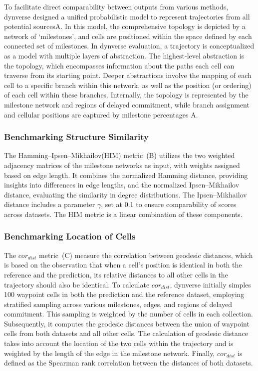 To facilitate direct comparability between outputs from various methods, dynverse\citep{saelens2019comparison} designed a unified probabilistic model to represent trajectories from all potential sourcesA. In this model, the comprehensive topology is depicted by a network of `milestones', and cells are positioned within the space defined by each connected set of milestones. In dynverse evaluation, a trajectory is conceptualized as a model with multiple layers of abstraction. The highest-level abstraction is the topology, which encompasses information about the paths each cell can traverse from its starting point. Deeper abstractions involve the mapping of each cell to a specific branch within this network, as well as the position (or ordering) of each cell within these branches. Internally, the topology is represented by the milestone network and regions of delayed commitment, while branch assignment and cellular positions are captured by milestone percentages A.


\subsubsection{Benchmarking Structure Similarity}
The Hamming–Ipsen–Mikhailov(HIM) metric~(B) utilizes the two weighted adjacency matrices of the milestone networks as input, with weights assigned based on edge length. It combines the normalized Hamming distance, providing insights into differences in edge lengths, and the normalized Ipsen–Mikhailov distance, evaluating the similarity in degree distributions. The Ipsen–Mikhailov distance includes a parameter $\gamma$, set at 0.1 to ensure comparability of scores across datasets. The HIM metric is a linear combination of these components.


\subsubsection{Benchmarking Location of Cells}

The $cor_{dist}$ metric~(C) measure the correlation between geodesic distances, which is based on the observation that when a cell's position is identical in both the reference and the prediction, its relative distances to all other cells in the trajectory should also be identical. To calculate $cor_{dist}$, dynverse initially simples 100 waypoint cells in both the prediction and the reference dataset, employing stratified sampling across various milestones, edges, and regions of delayed commitment. This sampling is weighted by the number of cells in each collection. Subsequently, it computes the geodesic distances between the union of waypoint cells from both datasets and all other cells. The calculation of geodesic distance takes into account the location of the two cells within the trajectory and is weighted by the length of the edge in the milestone network. Finally, $cor_{dist}$ is defined as the Spearman rank correlation between the distances of both datasets.

